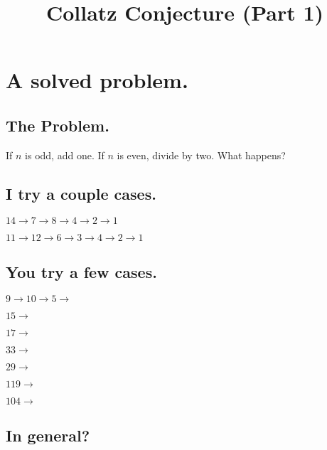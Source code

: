 \documentclass[12pt]{article}
\title{Collatz Conjecture (Part 1)}
\begin{document}
\Large

\section*{A solved problem.}

\subsection*{The Problem.}

If $n$ is odd, add one.  If $n$ is even, divide by two.  What happens?

\subsection*{I try a couple cases.}

\noindent $14 \to 7 \to 8 \to 4 \to 2 \to 1$

\noindent $11 \to 12 \to 6 \to 3 \to 4 \to 2 \to 1$

\subsection*{You try a few cases.}

\noindent $9 \to 10 \to 5 \to $
\vspace{3ex}

\noindent $15 \to$
\vspace{3ex}

\noindent $17 \to$
\vspace{3ex}

\noindent $33 \to$
\vspace{3ex}

\noindent $29 \to$
\vspace{3ex}

\noindent $119 \to$
\vspace{3ex}

\noindent $104 \to$
\vspace{3ex}

\subsection*{In general?}
\end{document}
